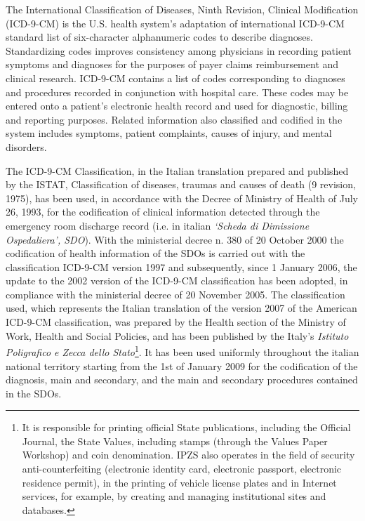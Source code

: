 The International Classification of Diseases, Ninth Revision, Clinical Modification (ICD-9-CM) is the U.S. health system's adaptation of international ICD-9-CM standard list of six-character alphanumeric codes to describe diagnoses. Standardizing codes improves consistency among physicians in recording patient symptoms and diagnoses for the purposes of payer claims reimbursement and clinical research.
ICD-9-CM contains a list of codes corresponding to diagnoses and procedures recorded in conjunction with hospital care. These codes may be entered onto a patient's electronic health record and used for diagnostic, billing and reporting purposes. Related information also classified and codified in the system includes symptoms, patient complaints, causes of injury, and mental disorders.

The ICD-9-CM Classification, in the Italian translation prepared and published by the ISTAT, Classification of diseases, traumas and causes of death (9 revision, 1975), has been used, in accordance with the Decree of Ministry of Health of July 26, 1993, for the codification of clinical information detected through the emergency room discharge record (i.e. in italian \textit{\enquote*{Scheda di Dimissione Ospedaliera}, SDO}). With the ministerial decree n. 380 of 20 October 2000 the codification of health information of the SDOs is carried out with the classification ICD-9-CM version 1997 and subsequently, since 1 January 2006, the update to the 2002 version of the ICD-9-CM classification has been adopted, in compliance with the ministerial decree of 20 November 2005.
The classification used, which represents the Italian translation of the version 2007 of the American ICD-9-CM classification, was prepared by the Health section of the Ministry of Work, Health and Social Policies, and has been published by the Italy's \textit{Istituto Poligrafico e Zecca dello Stato}\footnote{It is responsible for printing official State publications, including the Official Journal, the State Values, including stamps (through the Values Paper Workshop) and coin denomination. IPZS also operates in the field of security anti-counterfeiting (electronic identity card, electronic passport, electronic residence permit), in the printing of vehicle license plates and in Internet services, for example, by creating and managing institutional sites and databases.}. It has been used uniformly throughout the italian national territory starting from the 1st of January 2009 for the codification of the diagnosis, main and secondary, and the main and secondary procedures contained in the SDOs.

